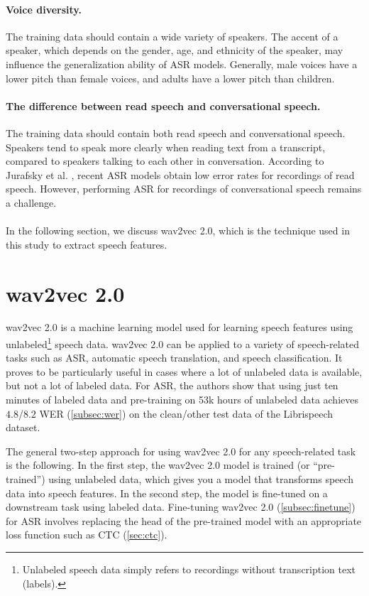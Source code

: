 \paragraph*{Voice diversity.}
The training data should contain a wide variety of speakers.
The accent of a speaker, which depends on the gender, age, and ethnicity of the speaker, 
may influence the generalization ability of ASR models. 
Generally, male voices have a lower pitch than female voices, and adults have a lower pitch than children.

\paragraph*{The difference between read speech and conversational speech.}
The training data should contain both read speech and conversational speech.
Speakers tend to speak more clearly when reading text from a transcript, compared to speakers talking to each other in conversation.
According to Jurafsky et al. \cite{jurafskyspeech}, recent ASR models obtain low error rates for recordings of read speech.
However, performing ASR for recordings of conversational speech remains a challenge.
\\
\\
In the following section, we discuss wav2vec 2.0, which is the technique used in this study to extract speech features.

\section{wav2vec 2.0}
wav2vec 2.0 \cite{baevski2020wav2vec} is a machine learning model used for learning speech features using unlabeled\footnote{Unlabeled speech data simply refers to recordings without transcription text (labels).} speech data.
wav2vec 2.0 can be applied to a variety of speech-related tasks such as ASR, automatic speech translation,
and speech classification.
It proves to be particularly useful in cases where a lot of unlabeled data is available, but not a lot of labeled data.
For ASR, the authors show that using just ten minutes of labeled data and pre-training
on 53k hours of unlabeled data achieves $4.8$/$8.2$ WER (\ref{subsec:wer}) on the clean/other test data of the Librispeech~\cite{panayotov2015librispeech} dataset.

The general two-step approach for using wav2vec 2.0 for any speech-related task is the following.
In the first step, the wav2vec 2.0 model is trained (or ``pre-trained'') using unlabeled data, which
gives you a model that transforms speech data into speech features.
In the second step, the model is fine-tuned on a downstream task using labeled data. 
Fine-tuning wav2vec 2.0 (\ref{subsec:finetune}) for ASR involves replacing the head of the 
pre-trained model with an appropriate loss function such as CTC (\ref{sec:ctc}).

